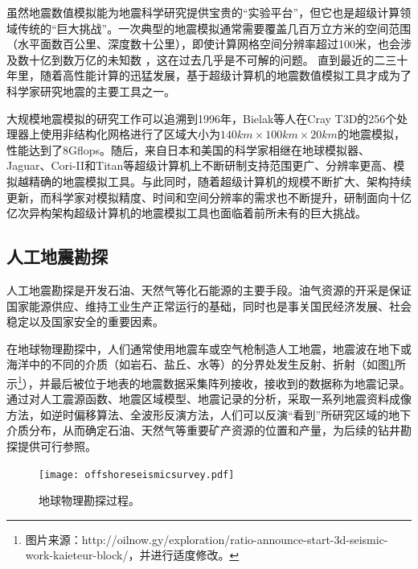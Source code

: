\documentclass[degree=doctor]{thuthesis}
\begin{document}
虽然地震数值模拟能为地震科学研究提供宝贵的“实验平台”，但它也是超级计算领域传统的“巨大挑战”。一次典型的地震模拟通常需要覆盖几百万立方米的空间范围（水平面数百公里、深度数十公里），即使计算网格空间分辨率超过100米，也会涉及数十亿到数万亿的未知数 \citep{cui2010scalable}，这在过去几乎是不可解的问题。 直到最近的二三十年里，随着高性能计算的迅猛发展，基于超级计算机的地震数值模拟工具才成为了科学家研究地震的主要工具之一。

大规模地震模拟的研究工作可以追溯到1996年，Bielak等人在Cray T3D的256个处理器上使用非结构化网格进行了区域大小为$140km \times 100km \times 20km$的地震模拟\citep{bao1996earthquake}，性能达到了8Gflops。随后，来自日本和美国的科学家相继在地球模拟器\cite{chen2006glueball}、Jaguar\cite{carrington2008high}、Cori-II\citep{breuer2017edge}和Titan\cite{cui2013physics}等超级计算机上不断研制支持范围更广、分辨率更高、模拟越精确的地震模拟工具。与此同时，随着超级计算机的规模不断扩大、架构持续更新，而科学家对模拟精度、时间和空间分辨率的需求也不断提升，研制面向十亿亿次异构架构超级计算机的地震模拟工具也面临着前所未有的巨大挑战。

\subsection{人工地震勘探}

人工地震勘探是开发石油、天然气等化石能源的主要手段。油气资源的开采是保证国家能源供应、维持工业生产正常运行的基础，同时也是事关国民经济发展、社会稳定以及国家安全的重要因素\cite{甘霖2016面向地球科学数值模拟的可重构计算方法研究}。

在地球物理勘探中，人们通常使用地震车或空气枪制造人工地震，地震波在地下或海洋中的不同的介质（如岩石、盐丘、水等）的分界处发生反射、折射（如图\ref{fig:offshoreseismicsurvey}所示\footnote{图片来源：http://oilnow.gy/exploration/ratio-announce-start-3d-seismic-work-kaieteur-block/，并进行适度修改。}），并最后被位于地表的地震数据采集阵列接收，接收到的数据称为地震记录。通过对人工震源函数、地震区域模型、地震记录的分析，采取一系列地震资料成像方法，如逆时偏移算法、全波形反演方法，人们可以反演“看到”所研究区域的地下介质分布，从而确定石油、天然气等重要矿产资源的位置和产量，为后续的钻井勘探提供可行参照。

\begin{figure}[t]
  \centering
  \texttt{[image: offshoreseismicsurvey.pdf]}
  \caption{地球物理勘探过程。}
  \label{fig:offshoreseismicsurvey}
\end{figure}
\end{document}
